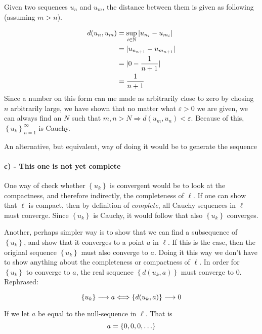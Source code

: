 \documentclass[a4paper]{article}
\theoremstyle{definition}
\begin{document}
Given two sequences $u_n$ and $u_m$, the distance between them is given as
following (assuming $m > n$).

\begin{align*}
  \notag
  d(u_n, u_m) &= \sup_{i\in\mathbb{N}}\left| u_{n_{i}} - u_{m_{i}} \right| \\ 
              &= | u_{n_{n+1}} - u_{m_{n+1}} | \\
              &= | 0 - \frac{1}{n+1} |\\
              &= \frac{1}{n+1}
\end{align*}
Since a number on this form can me made as arbitrarily close to zero by chosing
$n$ arbitrarily large, we have shown that no matter what $\varepsilon > 0$ we
are given, we can always find an $N$ such that $m, n > N \Longrightarrow d(u_m,
u_n) < \varepsilon$. Because of this, $\left\{ u_k \right\}_{n=1}^{\infty}$ is
Cauchy.

An alternative, but equivalent, way of doing it would be to generate the sequence

\paragraph{c) - This one is not yet complete}

One way of check whether $\left\{ u_k \right\}$ is convergent would be to look
at the compactness, and therefore indirectly, the completeness of $\ell$. If
one can show that $\ell$ is compact, then by definition of \textit{complete},
all Cauchy sequences in $\ell$ must converge.  Since $\left\{ u_k \right\}$ is
Cauchy, it would follow that also $\left\{ u_k \right\}$ converges.

Another, perhaps simpler way is to show that we can find a subsequence of
$\left\{ u_k \right\}$, and show that it converges to a point $a$ in $\ell$. If
this is the case, then the original sequence $\left\{ u_k \right\}$ must also
converge to $a$. Doing it this way we don't have to show anything about the
completeness or compactness of $\ell$.  In order for $\left\{ u_k \right\}$ to
converge to $a$, the real sequence $\left\{ d(u_k, a)\right\}$ must converge to
$0$.\\ Rephrased:

\begin{equation}
  \notag 
  \left\{ u_k \right\} \longrightarrow a \Longleftrightarrow \left\{ d(u_k, a) \right\} \longrightarrow 0
\end{equation}

If we let $a$ be equal to the null-sequence in $\ell$. That is
\begin{equation}
  \notag
  a = \left\{ 0, 0, 0, \ldots \right\}
\end{equation}
\end{document}
